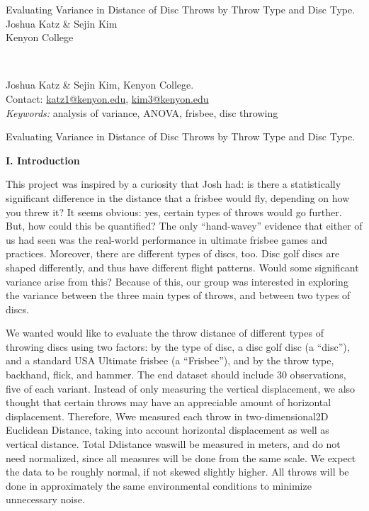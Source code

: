 \documentclass[letter,12pt]{article}
\begin{document}
	\thispagestyle{plain}
	\begin{center}
		\vspace*{150pt}
		Evaluating Variance in Distance of Disc Throws by Throw Type and Disc Type. \\
		Joshua Katz \& Sejin Kim \\
		Kenyon College \\
	\end{center}
	\vspace*{120pt}
	 \\
	\begin{raggedright}
		Joshua Katz \& Sejin Kim, Kenyon College. \\
		Contact: \href{mailto:katz1@kenyon.edu}{katz1@kenyon.edu}, \href{mailto:kim3@kenyon.edu}{kim3@kenyon.edu} \\
		\vspace*{40pt}
		\textit{Keywords:} analysis of variance, ANOVA, frisbee, disc throwing
	\end{raggedright}
	
	\newpage

	\begin{center}
		Evaluating Variance in Distance of Disc Throws by Throw Type and Disc Type.
	\end{center}
	\begin{center}
		\textbf{I. Introduction}
	\end{center}
	\justify
	This project was inspired by a curiosity that Josh had: is there a statistically significant difference in the distance that a frisbee would fly, depending on how you threw it? It seems obvious: yes, certain types of throws would go further. But, how could this be quantified? The only “hand-wavey” evidence that either of us had seen was the real-world performance in ultimate frisbee games and practices. Moreover, there are different types of discs, too. Disc golf discs are shaped differently, and thus have different flight patterns. Would some significant variance arise from this? Because of this, our group was interested in exploring the variance between the three main types of throws, and between two types of discs.

	We wanted would like to evaluate the throw distance of different types of throwing discs using two factors: by the type of disc, a disc golf disc (a “disc”), and a standard USA Ultimate frisbee (a “Frisbee”), and by the throw type, backhand, flick, and hammer. The end dataset should include 30 observations, five of each variant.  Instead of only measuring the vertical displacement, we also thought that certain throws may have an appreciable amount of horizontal displacement. Therefore, Wwe measured each throw in two-dimensional2D Euclidean Distance, taking into account horizontal displacement as well as vertical distance.  Total Ddistance waswill be measured in meters, and do not need normalized, since all measures will be done from the same scale. We expect the data to be roughly normal, if not skewed slightly higher. All throws will be done in approximately the same environmental conditions to minimize unnecessary noise.
\end{document}
